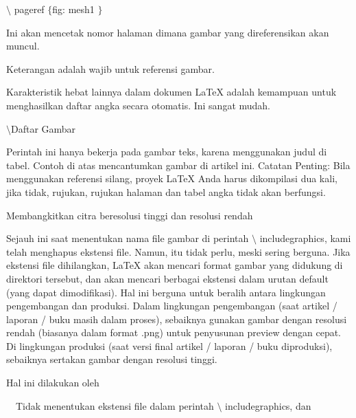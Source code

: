 \vspace{12pt}
\noindent 
 $  \setminus $ pageref  $  \{  $fig: mesh1 $  \}  $ \par
\noindent 
Ini akan mencetak nomor halaman dimana gambar yang direferensikan akan muncul. \par
\vspace{12pt}
\noindent 
Keterangan adalah wajib untuk referensi gambar. \par
\vspace{12pt}
\noindent 
Karakteristik hebat lainnya dalam dokumen LaTeX adalah kemampuan untuk menghasilkan daftar angka secara otomatis. Ini sangat mudah. \par
\vspace{12pt}
\noindent 
 $  \setminus $Daftar Gambar \par
\vspace{12pt}
\vspace{16pt}
\noindent 
Perintah ini hanya bekerja pada gambar teks, karena menggunakan judul di tabel. Contoh di atas mencantumkan gambar di artikel ini. Catatan Penting: Bila menggunakan referensi silang, proyek LaTeX Anda harus dikompilasi dua kali, jika tidak, rujukan, rujukan halaman dan tabel angka tidak akan berfungsi. \par
\vspace{16pt}
\noindent 
Membangkitkan citra beresolusi tinggi dan resolusi rendah \par
\vspace{12pt}
\noindent 
 \hspace*{0.5in} Sejauh ini saat menentukan nama file gambar di perintah  $  \setminus $ includegraphics, kami telah menghapus ekstensi file. Namun, itu tidak perlu, meski sering berguna. Jika ekstensi file dihilangkan, LaTeX akan mencari format gambar yang didukung di direktori tersebut, dan akan mencari berbagai ekstensi dalam urutan default (yang dapat dimodifikasi). Hal ini berguna untuk beralih antara lingkungan pengembangan dan produksi. Dalam lingkungan pengembangan (saat artikel / laporan / buku masih dalam proses), sebaiknya gunakan gambar dengan resolusi rendah (biasanya dalam format .png) untuk penyusunan preview dengan cepat. Di lingkungan produksi (saat versi final artikel / laporan / buku diproduksi), sebaiknya sertakan gambar dengan resolusi tinggi. \par
\vspace{12pt}
\noindent 
Hal ini dilakukan oleh \par
\vspace{12pt}
\noindent 
 $  $ $  $ $  $ $  $Tidak menentukan ekstensi file dalam perintah  $  \setminus $ includegraphics, dan \par
